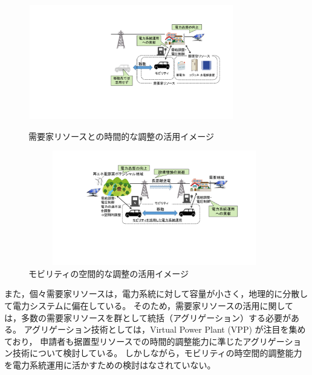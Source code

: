 \documentclass[11pt,a4paper,uplatex,dvipdfmx]{ujarticle} 		%
\newcommand{\研究課題名}{モビリティの時空間調整を活用した電力設備形成構築}
\newcommand{\研究機関名}{名古屋工業大学}
\newcommand{\研究代表者氏名}{中村勇太}
\newcommand{\研究期間の最終元号年度}{10}  %
\begin{document}
\begin{figure}

		\begin{center}
		\setlength{\abovecaptionskip}{0mm} %
		  \setlength{\belowcaptionskip}{-5mm} %
		  \includegraphics[width=9cm,height=5cm]{Summary_of_research_a.pdf}  
		  \caption{需要家リソースとの時間的な調整の活用イメージ}		  
		  \label{fig:Customer}
		\end{center}
		
		\begin{center}
			\setlength{\abovecaptionskip}{0mm} %
			  \setlength{\belowcaptionskip}{0mm} %
			  \includegraphics[width=11cm,height=5cm]{Summary_of_research_b.pdf}  
			  \caption{モビリティの空間的な調整の活用イメージ}
			  \label{fig:Mobility}
		\end{center}
\end{figure}


また，個々需要家リソースは，電力系統に対して容量が小さく，地理的に分散して電力システムに偏在している。
そのため，需要家リソースの活用に関しては，多数の需要家リソースを群として統括（アグリゲーション）する必要がある。
アグリゲーション技術としては，Virtual Power Plant (VPP) が注目を集めており，
申請者も据置型リソースでの時間的調整能力に準じたアグリゲーション技術について検討している。
しかしながら，モビリティの時空間的調整能力を電力系統運用に活かすための検討はなされていない。
\end{document}
